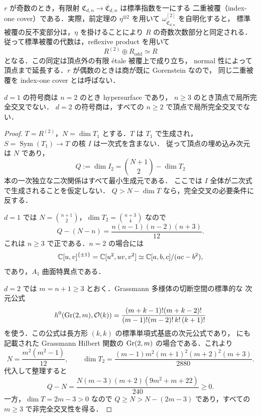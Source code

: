 \begin{remark}[標準指数を一にする被覆]
\label{rem:sign-index-one-cover}
$r$ が奇数のとき，有限射
$\mathfrak C_{d,n}\to\overline{\mathfrak C}_{d,n}$ は標準指数を一にする
二重被覆（index-one cover）である．実際，前定理の $\eta^{\otimes2}$ を用いて
$\omega_{\overline{\mathfrak C}_{d,n}}^{[2]}$ を自明化すると，
標準被覆の反不変部分は，$\eta$ を掛けることにより $R$ の奇数次数部分と同定される．
従って標準被覆の代数は，reflexive product を用いて
\[
 R^{(2)}\oplus R_{\mathrm{odd}}\simeq R
\]
となる．この同定は頂点外の有限 \'{e}tale 被覆上で成り立ち，
normal 性によって頂点まで延長する．$r$ が偶数のときは商が既に Gorenstein なので，
同じ二重被覆を index-one cover とは呼ばない．
\end{remark}

\begin{proposition}[符号商の局所完全交叉性]
\label{prop:sign-quotient-nonlci}
$d=1$ の符号商は $n=2$ のとき hypersurface であり，
$n\geq3$ のとき頂点で局所完全交叉でない．
$d=2$ の符号商は，すべての $n\geq2$ で頂点で局所完全交叉でない．
\end{proposition}
\begin{proof}
$T=R^{(2)}$，$N=\dim T_1$ とする．$T$ は $T_1$ で生成され，
$S=\operatorname{Sym}(T_1)\to T$ の核 $I$ は一次式を含まない．
従って頂点の埋め込み次元は $N$ であり，
\[
 Q:=\dim I_2=\binom{N+1}{2}-\dim T_2
\]
本の一次独立な二次関係はすべて最小生成元である．
ここでは $I$ 全体が二次式で生成されることを仮定しない．
$Q>N-\dim T$ なら，完全交叉の必要条件に反する．

$d=1$ では $N=\binom{n+1}{2}$，$\dim T_2=\binom{n+3}{4}$ なので
\[
 Q-\left(N-n\right)
 =\frac{n(n-1)(n-2)(n+3)}{12}.
\]
これは $n\geq3$ で正である．$n=2$ の場合には
\[
 \mathbb C[u,v]^{\{\pm1\}}
 =\mathbb C[u^2,uv,v^2]\simeq\mathbb C[a,b,c]/(ac-b^2),
\]
であり，$A_1$ 曲面特異点である．

$d=2$ では $m=n+1\geq3$ とおく．Grassmann 多様体の切断空間の標準的な
次元公式
\[
 h^0(\operatorname{Gr}(2,m),\mathcal O(k))
 =\frac{(m+k-1)!(m+k-2)!}
 {(m-1)!(m-2)!\,k!\,(k+1)!}
\]
を使う．この公式は長方形 $(k,k)$ の標準単項式基底の次元公式であり，
\cite[Proposition 1 and Theorem 1]{Braun2019} にも記載された Grassmann
Hilbert 関数の $\operatorname{Gr}(2,m)$ の場合である．これより
\[
 N=\frac{m^2(m^2-1)}{12},\qquad
 \dim T_2=\frac{(m-1)m^2(m+1)^2(m+2)^2(m+3)}{2880}.
\]
代入して整理すると
\[
 Q-N=\frac{N(m-3)(m+2)(9m^2+m+22)}{240}\geq0.
\]
一方，$\dim T=2m-3>0$ なので
$Q\geq N>N-(2m-3)$ であり，すべての $m\geq3$ で非完全交叉性を得る．
\end{proof}

